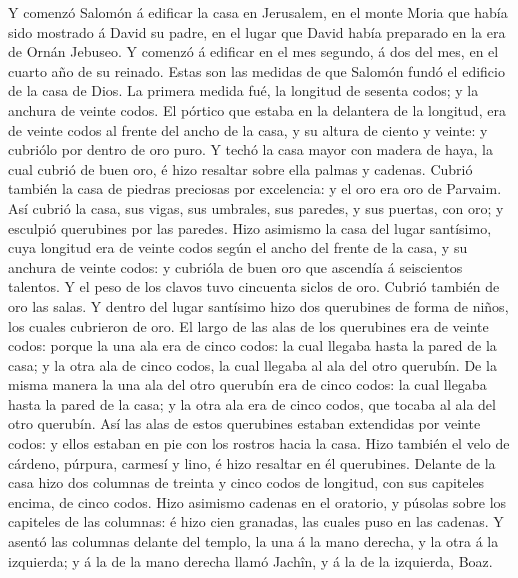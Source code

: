  Y comenzó Salomón á edificar la casa en Jerusalem, en el
monte Moria que había sido mostrado á David su padre, en el lugar que
David había preparado en la era de Ornán Jebuseo.  Y
comenzó á edificar en el mes segundo, á dos del mes, en el cuarto año de
su reinado.  Estas son las medidas de que Salomón fundó el
edificio de la casa de Dios. La primera medida fué, la longitud de
sesenta codos; y la anchura de veinte codos.  El pórtico
que estaba en la delantera de la longitud, era de veinte codos al frente
del ancho de la casa, y su altura de ciento y veinte: y cubriólo por
dentro de oro puro.  Y techó la casa mayor con madera de
haya, la cual cubrió de buen oro, é hizo resaltar sobre ella palmas y
cadenas.  Cubrió también la casa de piedras preciosas por
excelencia: y el oro era oro de Parvaim.  Así cubrió la
casa, sus vigas, sus umbrales, sus paredes, y sus puertas, con oro; y
esculpió querubines por las paredes.  Hizo asimismo la
casa del lugar santísimo, cuya longitud era de veinte codos según el
ancho del frente de la casa, y su anchura de veinte codos: y cubrióla de
buen oro que ascendía á seiscientos talentos.  Y el peso
de los clavos tuvo cincuenta siclos de oro. Cubrió también de oro las
salas.  Y dentro del lugar santísimo hizo dos querubines
de forma de niños, los cuales cubrieron de oro.  El largo
de las alas de los querubines era de veinte codos: porque la una ala era
de cinco codos: la cual llegaba hasta la pared de la casa; y la otra ala
de cinco codos, la cual llegaba al ala del otro querubín.
 De la misma manera la una ala del otro querubín era de
cinco codos: la cual llegaba hasta la pared de la casa; y la otra ala
era de cinco codos, que tocaba al ala del otro querubín. 
Así las alas de estos querubines estaban extendidas por veinte codos: y
ellos estaban en pie con los rostros hacia la casa.  Hizo
también el velo de cárdeno, púrpura, carmesí y lino, é hizo resaltar en
él querubines.  Delante de la casa hizo dos columnas de
treinta y cinco codos de longitud, con sus capiteles encima, de cinco
codos.  Hizo asimismo cadenas en el oratorio, y púsolas
sobre los capiteles de las columnas: é hizo cien granadas, las cuales
puso en las cadenas.  Y asentó las columnas delante del
templo, la una á la mano derecha, y la otra á la izquierda; y á la de la
mano derecha llamó Jachîn, y á la de la izquierda, Boaz.

